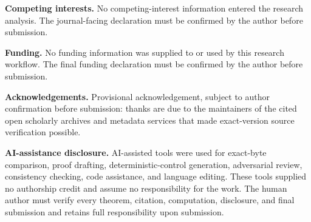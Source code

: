 \documentclass[11pt]{article}
\theoremstyle{definition}
\begin{document}
\noindent\textbf{Competing interests.}
No competing-interest information entered the research analysis.  The journal-facing declaration must be confirmed by the author before submission.

\noindent\textbf{Funding.}
No funding information was supplied to or used by this research workflow.  The final funding declaration must be confirmed by the author before submission.

\noindent\textbf{Acknowledgements.}
Provisional acknowledgement, subject to author confirmation before submission: thanks are due to the maintainers of the cited open scholarly archives and metadata services that made exact-version source verification possible.

\noindent\textbf{AI-assistance disclosure.}
AI-assisted tools were used for exact-byte comparison, proof drafting, deterministic-control generation, adversarial review, consistency checking, code assistance, and language editing.  These tools supplied no authorship credit and assume no responsibility for the work.  The human author must verify every theorem, citation, computation, disclosure, and final submission and retains full responsibility upon submission.



\end{document}
